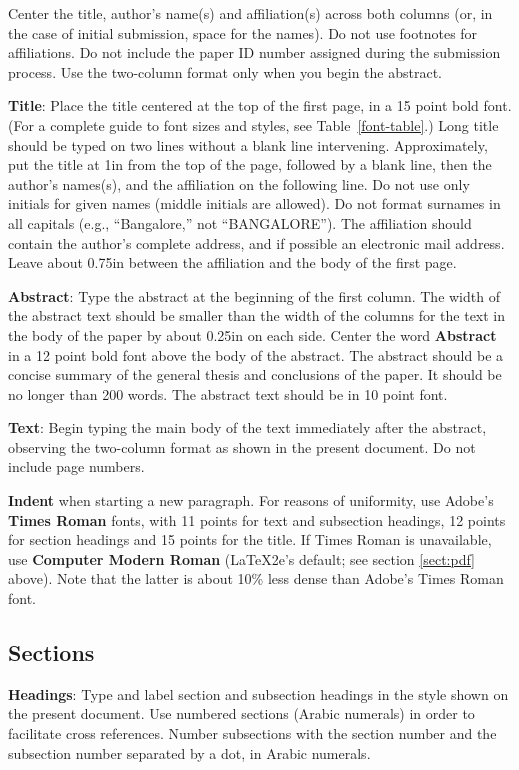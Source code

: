 \documentclass[11pt,letterpaper]{article}
\begin{document}
Center the title, author's name(s) and affiliation(s) across both
columns (or, in the case of initial submission, space for the names). 
Do not use footnotes for affiliations.  Do not include the
paper ID number assigned during the submission process. 
Use the two-column format only when you begin the abstract.

{\bf Title}: Place the title centered at the top of the first page, in
a 15 point bold font.  (For a complete guide to font sizes and styles, see Table~\ref{font-table}.)
Long title should be typed on two lines without
a blank line intervening. Approximately, put the title at 1in from the
top of the page, followed by a blank line, then the author's names(s),
and the affiliation on the following line.  Do not use only initials
for given names (middle initials are allowed). Do not format surnames
in all capitals (e.g., ``Bangalore,'' not ``BANGALORE'').  The affiliation should
contain the author's complete address, and if possible an electronic
mail address. Leave about 0.75in between the affiliation and the body
of the first page.

{\bf Abstract}: Type the abstract at the beginning of the first
column.  The width of the abstract text should be smaller than the
width of the columns for the text in the body of the paper by about
0.25in on each side.  Center the word {\bf Abstract} in a 12 point
bold font above the body of the abstract. The abstract should be a
concise summary of the general thesis and conclusions of the paper.
It should be no longer than 200 words.  The abstract text should be in 10 point font.

{\bf Text}: Begin typing the main body of the text immediately after
the abstract, observing the two-column format as shown in 
the present document.  Do not include page numbers.

{\bf Indent} when starting a new paragraph. For reasons of uniformity,
use Adobe's {\bf Times Roman} fonts, with 11 points for text and 
subsection headings, 12 points for section headings and 15 points for
the title.  If Times Roman is unavailable, use {\bf Computer Modern
  Roman} (\LaTeX2e{}'s default; see section \ref{sect:pdf} above).
Note that the latter is about 10\% less dense than Adobe's Times Roman
font.

\subsection{Sections}

{\bf Headings}: Type and label section and subsection headings in the
style shown on the present document.  Use numbered sections (Arabic
numerals) in order to facilitate cross references. Number subsections
with the section number and the subsection number separated by a dot,
in Arabic numerals. 
\end{document}
